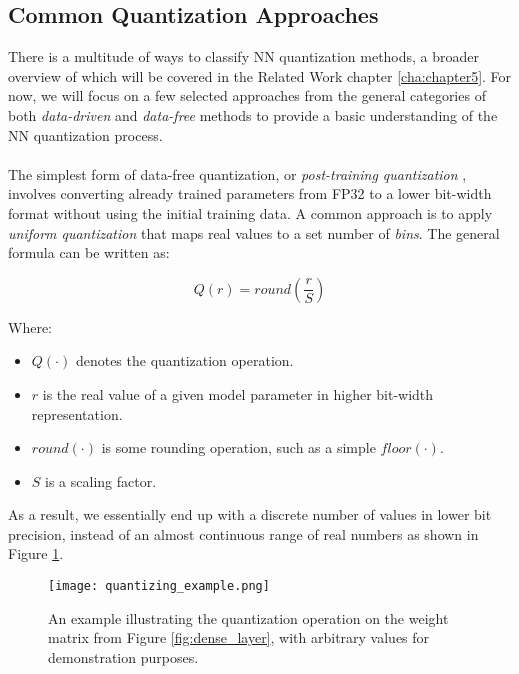 \subsection{Common Quantization Approaches}
\label{subsec:subsection2}

There is a multitude of ways to classify NN quantization methods, a broader overview of which will be covered
in the Related Work chapter \ref{cha:chapter5}.
For now, we will focus on a few selected approaches from the general categories of both 
\textit{data-driven} and \textit{data-free} methods \cite{Edouard2022SPIQ} to provide a basic understanding of the NN quantization process.
\\
\\
The simplest form of data-free quantization, or \textit{post-training quantization} \cite{jiang2021efficient},
involves converting already trained parameters from FP32 to a lower bit-width format
without using the initial training data. 
A common approach is to apply \textit{uniform quantization} that maps real values to a set number
of \textit{bins}. The general formula can be written as:

\[
Q(r) = round(\frac{r}{S})
\]

\noindent Where:
\begin{itemize}
    \item $Q(\cdot)$ denotes the quantization operation.
    \item $r$ is the real value of a given model parameter in higher bit-width representation.
    \item $round(\cdot)$ is some rounding operation, such as a simple $floor(\cdot)$.
    \item $S$ is a scaling factor.
\end{itemize}

\noindent  As a result, we essentially end up with a discrete number of values in lower bit precision, 
instead of an almost continuous range of real numbers as shown in Figure \ref{fig:quantizing_example}.
\\
\begin{figure}[h!]
  \centering
  \texttt{[image: quantizing\_example.png]}
  \caption{An example illustrating the quantization operation on the weight matrix from Figure \ref{fig:dense_layer}, 
  with arbitrary values for demonstration purposes.}
  \label{fig:quantizing_example}
\end{figure}

